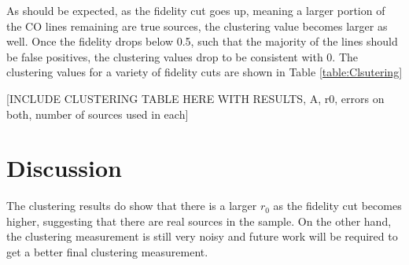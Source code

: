 As should be expected, as the fidelity cut goes up, meaning a larger portion of the CO lines remaining are true sources, the clustering value becomes larger as well. Once the fidelity drops below 0.5, such that the majority of the lines should be false positives, the clustering values drop to be consistent with 0. The clustering values for a variety of fidelity cuts are shown in Table \ref{table:Clsutering}

[INCLUDE CLUSTERING TABLE HERE WITH RESULTS, A, r0, errors on both, number of sources used in each] \label{table:Clustering}

\section{Discussion}

The clustering results do show that there is a larger $r_0$ as the fidelity cut becomes higher, suggesting that there are real sources in the sample. On the other hand, the clustering measurement is still very noisy and future work will be required to get a better final clustering measurement.